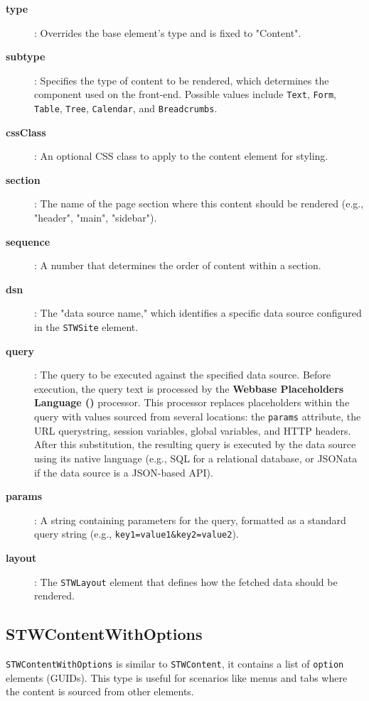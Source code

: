 \begin{description}
\item[\textbf{type}]: Overrides the base element's type and is fixed to "Content".
\item[\textbf{subtype}]: Specifies the type of content to be rendered, which determines the component used on the front-end. Possible values include \texttt{Text}, \texttt{Form}, \texttt{Table}, \texttt{Tree}, \texttt{Calendar}, and \texttt{Breadcrumbs}.
\item[\textbf{cssClass}]: An optional CSS class to apply to the content element for styling.
\item[\textbf{section}]: The name of the page section where this content should be rendered (e.g., "header", "main", "sidebar").
\item[\textbf{sequence}]: A number that determines the order of content within a section.
\item[\textbf{dsn}]: The "data source name," which identifies a specific data source configured in the \texttt{STWSite} element.
\item[\textbf{query}]: The query to be executed against the specified data source. Before execution, the query text is processed by the \textbf{Webbase Placeholders Language (\wbpl{})} processor. This processor replaces placeholders within the query with values sourced from several locations: the \texttt{params} attribute, the URL querystring, session variables, global variables, and HTTP headers. After this substitution, the resulting query is executed by the data source using its native language (e.g., SQL for a relational database, or JSONata if the data source is a JSON-based API).
\item[\textbf{params}]: A string containing parameters for the query, formatted as a standard query string (e.g., \texttt{key1=value1\&key2=value2}).
\item[\textbf{layout}]: The \texttt{STWLayout} element that defines how the fetched data should be rendered.
\end{description}

\subsection{STWContentWithOptions}

\texttt{STWContentWithOptions} is similar to \texttt{STWContent}, it contains a list of \texttt{option} elements (GUIDs). This type is useful for scenarios like menus and tabs where the content is sourced from other elements.

